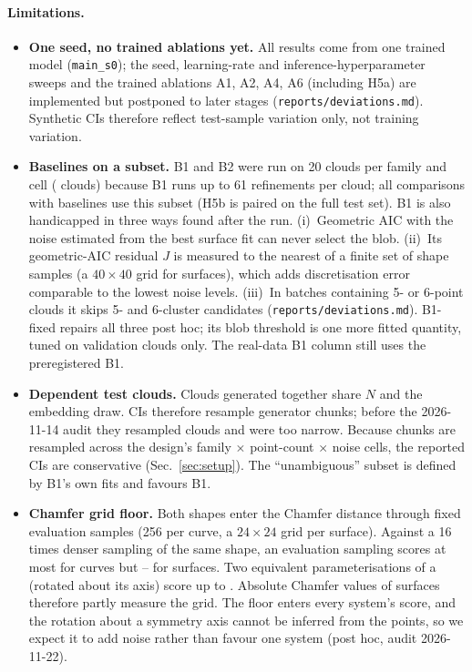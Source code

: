 \paragraph{Limitations.}
\label{sec:limitations}
\begin{itemize}
\item \textbf{One seed, no trained ablations yet.} All results come from one trained model (\texttt{main\_s0}); the seed, learning-rate and inference-hyperparameter sweeps and the trained ablations A1, A2, A4, A6 (including H5a) are implemented but postponed to later stages (\texttt{reports/deviations.md}). Synthetic CIs therefore reflect test-sample variation only, not training variation.
\item \textbf{Baselines on a subset.} B1 and B2 were run on 20 clouds per family and cell (\nBone{} clouds) because B1 runs up to 61 refinements per cloud; all comparisons with baselines use this subset (H5b is paired on the full test set). B1 is also handicapped in three ways found after the run. (i)~Geometric AIC with the noise estimated from the best surface fit can never select the blob. (ii)~Its geometric-AIC residual $J$ is measured to the nearest of a finite set of shape samples (a $40\times40$ grid for surfaces), which adds discretisation error comparable to the lowest noise levels. (iii)~In batches containing 5- or 6-point clouds it skips 5- and 6-cluster candidates (\texttt{reports/deviations.md}). B1-fixed repairs all three post hoc; its blob threshold is one more fitted quantity, tuned on validation clouds only. The real-data B1 column still uses the preregistered B1.
\item \textbf{Dependent test clouds.} Clouds generated together share $N$ and the embedding draw. CIs therefore resample generator chunks; before the 2026-11-14 audit they resampled clouds and were too narrow. Because chunks are resampled across the design's family $\times$ point-count $\times$ noise cells, the reported CIs are conservative (Sec.~\ref{sec:setup}). The ``unambiguous'' subset is defined by B1's own fits and favours B1.
\item \textbf{Chamfer grid floor.} Both shapes enter the Chamfer distance through fixed evaluation samples (256 per curve, a $24\times24$ grid per surface). Against a 16 times denser sampling of the same shape, an evaluation sampling scores at most \floorCurveMax{} for curves but \floorSurfMin{}--\floorSurfMax{} for surfaces. Two equivalent parameterisations of a \floorSymFams{} (rotated about its axis) score up to \floorSymMax{}. Absolute Chamfer values of surfaces therefore partly measure the grid. The floor enters every system's score, and the rotation about a symmetry axis cannot be inferred from the points, so we expect it to add noise rather than favour one system (post hoc, audit 2026-11-22).

\end{itemize}
